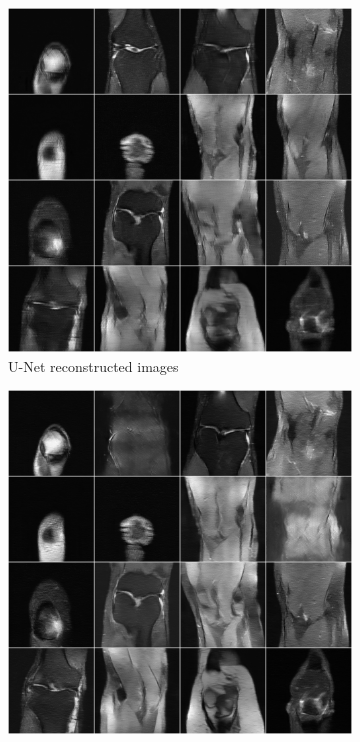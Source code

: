 \documentclass{article}
\begin{document}
\begin{figure}[H] 
\centering
   \begin{subfigure}[]{.5\textwidth}
   \centering
        \includegraphics[width=.95\linewidth]{Unet_reconstruction}
	\caption{U-Net  reconstructed images}
	\vspace*{2mm} 
    \end{subfigure}%
   \begin{subfigure}[]{.5\textwidth}
   \centering
        \includegraphics[width=.95\linewidth]{neumann_reconstruction}

\end{subfigure}
\end{figure}
\end{document}
